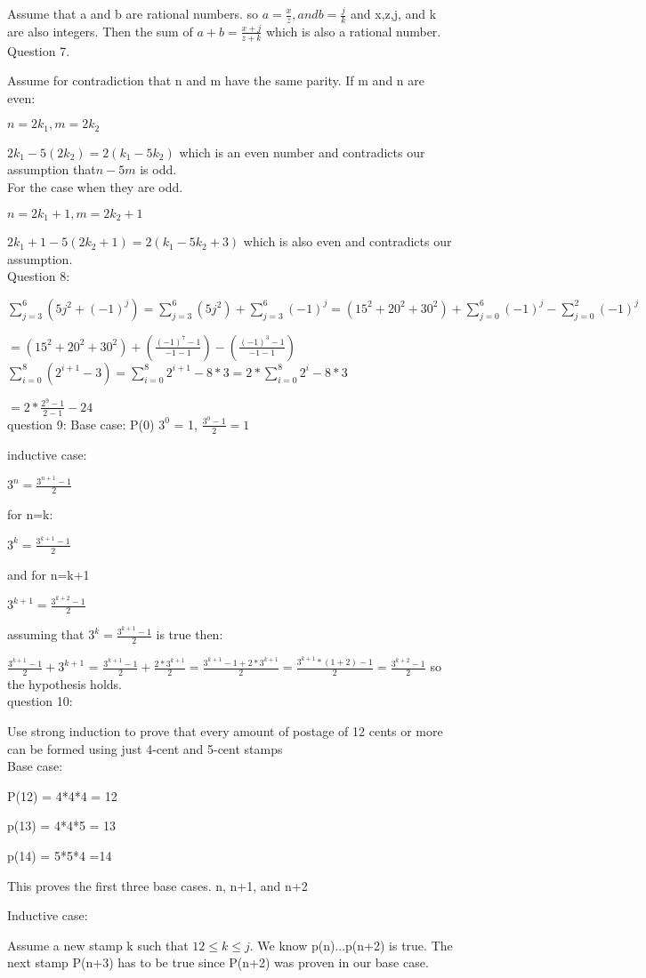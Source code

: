 \documentclass[11pt]{article}
\begin{document}
Assume that a and b are rational numbers.  so $a = \frac{x}{z}, and b = \frac{j}{k}$ and x,z,j, and k are also integers.  Then the sum of $a+b = \frac{x+j}{z+k} $ which is also a rational number. \\

Question 7. 

Assume for contradiction that n and m have the same parity.  If m and n are even:

$n = 2k_1, m = 2k_2$

$2k_1-5(2k_2) = 2(k_1 - 5k_2)$ which is an even number and contradicts our assumption that$n-5m$ is odd. \\

For the case when they are odd.

$n=2k_1+1, m=2k_2+1$

$2k_1+1-5(2k_2+1) = 2(k_1-5k_2+3)$ which is also even and contradicts our assumption. \\

Question 8:

$\sum_{j=3}^6 (5j^2+(-1)^j) = \sum_{j=3}^6 (5j^2) + \sum_{j=3}^6 (-1)^j = (15^2+20^2+30^2)+ \sum_{j=0}^6 (-1)^j - \sum_{j=0}^2 (-1)^j $

$ = (15^2+20^2+30^2)+ (\frac{(-1)^7-1}{-1-1})- (\frac{(-1)^3-1}{-1-1})$\\

$\sum_{i=0}^8 (2^{i+1} - 3) = \sum_{i=0}^8 2^{i+1} - 8*3 = 2* \sum_{i=0}^8 2^i - 8*3$

$= 2*\frac{2^9-1}{2-1} - 24$\\

question 9:
Base case: P(0) $3^0$ = 1, $\frac{3^0-1}{2}=1$

inductive case:

$ 3^n = \frac{3^{n+1}-1}{2} $

for n=k:

$ 3^k = \frac{3^{k+1}-1}{2} $

and for n=k+1

$ 3^{k+1} = \frac{3^{k+2}-1}{2} $

assuming that $ 3^k = \frac{3^{k+1}-1}{2} $ is true then:

$\frac{3^{k+1}-1}{2} + 3^{k+1}$ = $\frac{3^{k+1}-1}{2} + \frac{2*3^{k+1}}{2} =  \frac{3^{k+1}-1+2*3^{k+1}}{2} = \frac{3^{k+1}*(1+2)-1}{2} = \frac{3^{k+2}-1}{2}$ so the hypothesis holds. \\

question 10:

Use strong induction to prove that every amount of postage of 12 cents or more can be formed using just 4-cent and 5-cent stamps\\

Base case:

 P(12) = 4*4*4 = 12 

p(13) = 4*4*5 = 13

p(14) = 5*5*4 =14

This proves the first three base cases. n, n+1, and n+2 

Inductive case: 

Assume a new stamp k such that $12 \leq k \leq j$. We know p(n)...p(n+2) is true. The next stamp P(n+3) has to be true since P(n+2) was proven in our base case.  
\end{document}

